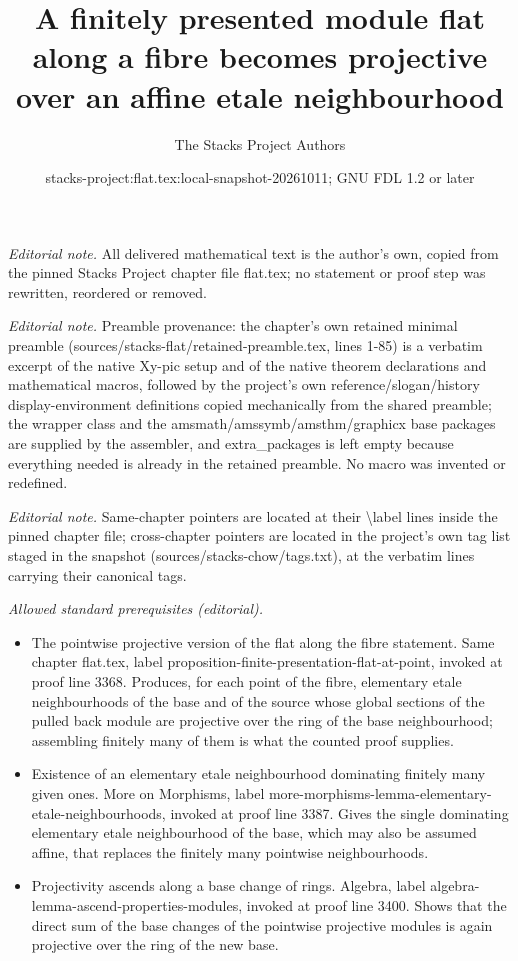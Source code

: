 \documentclass[10pt,a4paper]{amsart}
\title{A finitely presented module flat along a fibre becomes projective over an affine etale neighbourhood}
\author{The Stacks Project Authors}
\date{stacks-project:flat.tex:local-snapshot-20261011; GNU FDL 1.2 or later}
\theoremstyle{plain}
\theoremstyle{definition}
\theoremstyle{remark}
\numberwithin{equation}{subsection}
\begin{document}
\maketitle
\noindent\textit{Editorial note.} All delivered mathematical text is the author's own, copied from the pinned Stacks Project chapter file flat.tex; no statement or proof step was rewritten, reordered or removed.\par\medskip
\noindent\textit{Editorial note.} Preamble provenance: the chapter's own retained minimal preamble (sources/stacks-flat/retained-preamble.tex, lines 1-85) is a verbatim excerpt of the native Xy-pic setup and of the native theorem declarations and mathematical macros, followed by the project's own reference/slogan/history display-environment definitions copied mechanically from the shared preamble; the wrapper class and the amsmath/amssymb/amsthm/graphicx base packages are supplied by the assembler, and extra\_packages is left empty because everything needed is already in the retained preamble. No macro was invented or redefined.\par\medskip
\noindent\textit{Editorial note.} Same-chapter pointers are located at their \textbackslash{}label lines inside the pinned chapter file; cross-chapter pointers are located in the project's own tag list staged in the snapshot (sources/stacks-chow/tags.txt), at the verbatim lines carrying their canonical tags.\par\medskip
\noindent\textit{Allowed standard prerequisites (editorial).}\begin{itemize}
\item The pointwise projective version of the flat along the fibre statement. Same chapter flat.tex, label proposition-finite-presentation-flat-at-point, invoked at proof line 3368. Produces, for each point of the fibre, elementary etale neighbourhoods of the base and of the source whose global sections of the pulled back module are projective over the ring of the base neighbourhood; assembling finitely many of them is what the counted proof supplies.
\item Existence of an elementary etale neighbourhood dominating finitely many given ones. More on Morphisms, label more-morphisms-lemma-elementary-etale-neighbourhoods, invoked at proof line 3387. Gives the single dominating elementary etale neighbourhood of the base, which may also be assumed affine, that replaces the finitely many pointwise neighbourhoods.
\item Projectivity ascends along a base change of rings. Algebra, label algebra-lemma-ascend-properties-modules, invoked at proof line 3400. Shows that the direct sum of the base changes of the pointwise projective modules is again projective over the ring of the new base.
\end{itemize}\medskip
\end{document}

